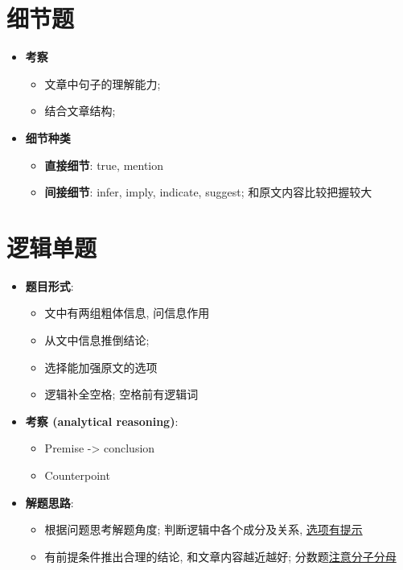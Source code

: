 \section{细节题}

  \begin{itemize}
    \item \textbf{考察}
    \begin{itemize}
      \item 文章中句子的理解能力;
      \item 结合文章结构;
    \end{itemize}

    \item \textbf{细节种类}
    \begin{itemize}
      \item \textbf{直接细节}: true, mention
      \item \textbf{间接细节}: infer, imply, indicate, suggest;
      和原文内容比较把握较大
    \end{itemize}
  \end{itemize}

\section{逻辑单题}

  \begin{itemize}
    \item \textbf{题目形式}:
    \begin{itemize}
      \item 文中有两组粗体信息, 问信息作用
      \item 从文中信息推倒结论;
      \item 选择能加强原文的选项
      \item 逻辑补全空格; 空格前有逻辑词
    \end{itemize}

    \item \textbf{考察 (analytical reasoning)}:
    \begin{itemize}
      \item Premise -> conclusion
      \item Counterpoint
    \end{itemize}

    \item \textbf{解题思路}:
    \begin{itemize}
      \item 根据问题思考解题角度; 判断逻辑中各个成分及关系, \uline{选项有提示}
      \item 有前提条件推出合理的结论, 和文章内容越近越好; 分数题\uline{注意分子分母}
    \end{itemize}
  \end{itemize}

